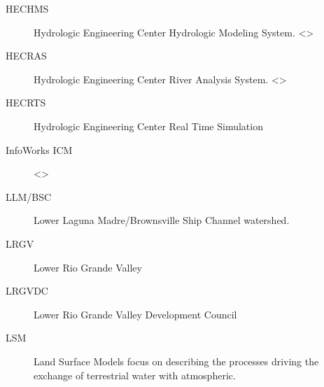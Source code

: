 \documentclass[letterpaper,10pt,english]{sphinxmanual}
\begin{document}
\begin{description}
\item[{HEC\sphinxhyphen{}HMS\label{\detokenize{glossary:term-HEC-HMS}}}] \leavevmode
\sphinxAtStartPar
Hydrologic Engineering Center Hydrologic Modeling System. \textless{}\textgreater{}

\item[{HEC\sphinxhyphen{}RAS\label{\detokenize{glossary:term-HEC-RAS}}}] \leavevmode
\sphinxAtStartPar
Hydrologic Engineering Center River Analysis System.  \textless{}\textgreater{}

\item[{HEC\sphinxhyphen{}RTS\label{\detokenize{glossary:term-HEC-RTS}}}] \leavevmode
\sphinxAtStartPar
Hydrologic Engineering Center Real Time Simulation

\item[{InfoWorks ICM\label{\detokenize{glossary:term-InfoWorks-ICM}}}] \leavevmode
\sphinxAtStartPar
\textless{}\textgreater{}

\item[{LLM/BSC\label{\detokenize{glossary:term-LLM-BSC}}}] \leavevmode
\sphinxAtStartPar
Lower Laguna Madre/Brownsville Ship Channel watershed.

\item[{LRGV\label{\detokenize{glossary:term-LRGV}}}] \leavevmode
\sphinxAtStartPar
Lower Rio Grande Valley

\item[{LRGVDC\label{\detokenize{glossary:term-LRGVDC}}}] \leavevmode
\sphinxAtStartPar
Lower Rio Grande Valley Development Council

\item[{LSM\label{\detokenize{glossary:term-LSM}}}] \leavevmode
\sphinxAtStartPar
Land Surface Models focus on describing the processes driving the exchange of terrestrial water with atmospheric.


\end{description}
\end{document}
